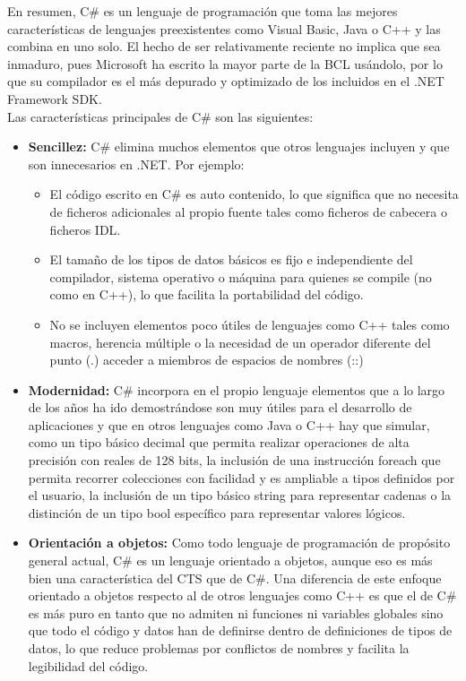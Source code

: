 En resumen, C\# es un lenguaje de programaci\'on que toma las mejores caracter\'isticas de lenguajes preexistentes como Visual Basic, Java o C++ y las combina en uno solo. El hecho de ser relativamente reciente no implica que sea inmaduro, pues Microsoft ha escrito la mayor parte de la BCL us\'andolo, por lo que su compilador es el m\'as depurado y optimizado de los incluidos en el .NET Framework SDK.\\

Las caracter\'isticas principales de C\# son las siguientes:
\begin{itemize}
	\item \textbf{Sencillez:} C\# elimina muchos elementos que otros lenguajes incluyen y que son innecesarios en .NET. Por ejemplo: 
		\begin{itemize}
			\item El c\'odigo escrito en C\# es auto contenido, lo que significa que no necesita de ficheros adicionales al propio fuente tales como ficheros de cabecera o ficheros IDL.
			\item El tama\~no de los tipos de datos b\'asicos es fijo e independiente del compilador, sistema operativo o m\'aquina para quienes se compile (no como en C++), lo que facilita la portabilidad del c\'odigo.
			\item No se incluyen elementos poco \'utiles de lenguajes como C++ tales como macros, herencia m\'ultiple o la necesidad de un operador diferente del punto (.) acceder a miembros de espacios de nombres (::) 
		\end{itemize}
		\item \textbf{Modernidad: } C\# incorpora en el propio lenguaje elementos que a lo largo de los a\~nos ha ido demostr\'andose son muy \'utiles para el desarrollo de aplicaciones y que en otros lenguajes como Java o C++ hay que simular, como un tipo b\'asico decimal que permita realizar operaciones de alta precisi\'on con reales de 128 bits, la inclusi\'on de una instrucci\'on foreach que permita recorrer colecciones con facilidad y es ampliable a tipos definidos por el usuario, la inclusi\'on de un tipo b\'asico string para representar cadenas o la distinci\'on de un tipo bool espec\'ifico para representar valores l\'ogicos. 
		
		\item \textbf{Orientaci\'on a objetos: }Como todo lenguaje de programaci\'on de prop\'osito general actual, C\# es un lenguaje orientado a objetos, aunque eso es m\'as bien una caracter\'istica del CTS que de C\#. Una diferencia de este enfoque orientado a objetos respecto al de otros lenguajes como C++ es que el de C\# es m\'as puro en tanto que no admiten ni funciones ni variables globales sino que todo el c\'odigo y datos han de definirse dentro de definiciones de tipos de datos, lo que reduce problemas por conflictos de nombres y facilita la legibilidad del c\'odigo.\\


\end{itemize}
